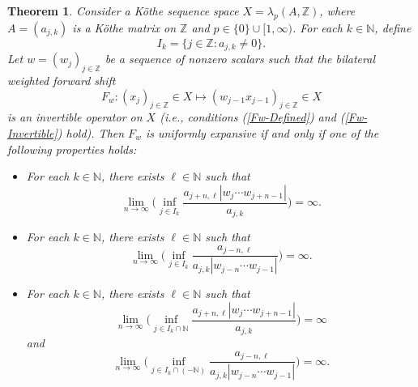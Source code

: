 \documentclass[10pt,a4paper]{amsart}
\newtheorem{theorem}{Theorem}
\newcommand{\N}{\mathbb{N}}   %
\newcommand{\Z}{\mathbb{Z}}   %
\begin{document}
\begin{theorem}\label{UEWS-T1}
Consider a K\"othe sequence space $X = \lambda_p(A,\Z)$, where $A = (a_{j,k})$ is a K\"othe matrix on $\Z$ 
and $p \in \{0\} \cup [1,\infty)$. For each $k \in \N$, define
\[
I_k = \{j \in \Z : a_{j,k} \neq 0\}.
\]
Let $w = (w_j)_{j \in \Z}$ be a sequence of nonzero scalars such that the bilateral weighted forward shift
\[
F_w : (x_j)_{j \in \Z} \in X \mapsto (w_{j-1}x_{j-1})_{j \in \Z} \in X
\]
is an invertible operator on $X$ (i.e., conditions (\ref{Fw-Defined}) and (\ref{Fw-Invertible}) hold). 
Then $F_w$ is uniformly expansive if and only if one of the following properties holds:
\begin{itemize}
\item [\rm (A)] For each $k \in \N$, there exists $\ell \in \N$ such that
    \[
    \lim_{n \to \infty} \Big(\inf_{j \in I_k} \frac{a_{j+n,\ell} |w_j \cdots w_{j+n-1}|}{a_{j,k}}\Big) = \infty.
    \]
\item [\rm (B)] For each $k \in \N$, there exists $\ell \in \N$ such that
    \[
    \lim_{n \to \infty} \Big(\inf_{j \in I_k} \frac{a_{j-n,\ell}}{a_{j,k} |w_{j-n} \cdots w_{j-1}|}\Big) = \infty.
    \]
\item [\rm (C)] For each $k \in \N$, there exists $\ell \in \N$ such that
    \[
    \lim_{n \to \infty} \Big(\inf_{j \in I_k \cap \N} \frac{a_{j+n,\ell} |w_j \cdots w_{j+n-1}|}{a_{j,k}}\Big) = \infty
    \]
    and
    \[
    \lim_{n \to \infty} \Big(\inf_{j \in I_k \cap (-\N)} \frac{a_{j-n,\ell}}{a_{j,k} |w_{j-n} \cdots w_{j-1}|}\Big) = \infty.
    \]
\end{itemize}
\end{theorem}
\end{document}
